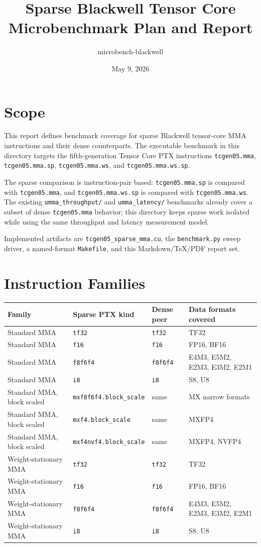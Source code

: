 \documentclass[11pt]{article}
\title{Sparse Blackwell Tensor Core Microbenchmark Plan and Report}
\author{microbench-blackwell}
\date{May 9, 2026}
\begin{document}
\maketitle

\section{Scope}

This report defines benchmark coverage for sparse Blackwell tensor-core MMA
instructions and their dense counterparts. The executable benchmark in this
directory targets the fifth-generation Tensor Core PTX instructions
\texttt{tcgen05.mma}, \texttt{tcgen05.mma.sp}, \texttt{tcgen05.mma.ws}, and
\texttt{tcgen05.mma.ws.sp}.

The sparse comparison is instruction-pair based: \texttt{tcgen05.mma.sp} is
compared with \texttt{tcgen05.mma}, and \texttt{tcgen05.mma.ws.sp} is compared
with \texttt{tcgen05.mma.ws}. The existing \texttt{umma\_throughput/} and
\texttt{umma\_latency/} benchmarks already cover a subset of dense
\texttt{tcgen05.mma} behavior; this directory keeps sparse work isolated while
using the same throughput and latency measurement model.

Implemented artifacts are \texttt{tcgen05\_sparse\_mma.cu}, the
\texttt{benchmark.py} sweep driver, a named-format \texttt{Makefile}, and this
Markdown/TeX/PDF report set.

\section{Instruction Families}

\begin{longtable}{llll}
\toprule
Family & Sparse PTX kind & Dense peer & Data formats covered \\
\midrule
\endhead
Standard MMA & \texttt{tf32} & \texttt{tf32} & TF32 \\
Standard MMA & \texttt{f16} & \texttt{f16} & FP16, BF16 \\
Standard MMA & \texttt{f8f6f4} & \texttt{f8f6f4} & E4M3, E5M2, E2M3, E3M2, E2M1 \\
Standard MMA & \texttt{i8} & \texttt{i8} & S8, U8 \\
Standard MMA, block scaled & \texttt{mxf8f6f4.block\_scale} & same & MX narrow formats \\
Standard MMA, block scaled & \texttt{mxf4.block\_scale} & same & MXFP4 \\
Standard MMA, block scaled & \texttt{mxf4nvf4.block\_scale} & same & MXFP4, NVFP4 \\
Weight-stationary MMA & \texttt{tf32} & \texttt{tf32} & TF32 \\
Weight-stationary MMA & \texttt{f16} & \texttt{f16} & FP16, BF16 \\
Weight-stationary MMA & \texttt{f8f6f4} & \texttt{f8f6f4} & E4M3, E5M2, E2M3, E3M2, E2M1 \\
Weight-stationary MMA & \texttt{i8} & \texttt{i8} & S8, U8 \\
\bottomrule
\end{longtable}
\end{document}

